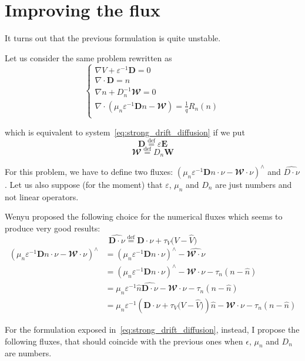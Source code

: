 \documentclass[a4paper,12pt, draft]{article}
\newcommand{\Def}{\stackrel{\mathrm{def}}{=}}
\newcommand{\diver}[1]{\ensuremath{\nabla \cdot #1}}
\newcommand{\WW}{\mathbfcal{W}}
\begin{document}
\section{Improving the flux}
It turns out that the previous formulation is quite unstable.

Let us consider the same problem rewritten as
\[
 \begin{cases}
  \nabla V + \varepsilon^{-1}\mathbf{D} = 0 \\
  \diver{\mathbf{D}} = n \\
  \nabla n + D_n^{-1} \WW = 0 \\
  \diver{\left(\mu_n \varepsilon^{-1} \mathbf{D} n - \WW \right)} = \frac{1}{q}R_n(n) \\
 \end{cases}
\]

which is equivalent to system~\ref{eq:strong_drift_diffusion} if we put
\[
  \mathbf{D} \Def \varepsilon \mathbf{E}
\]
\[
  \WW \Def D_n \mathbf{W}
\]

For this problem, we have to define two fluxes: $\left(\mu_n
\varepsilon^{-1} \mathbf{D} n \cdot \nu - \WW \cdot \nu \right)^{\wedge}$ and $\widehat{D \cdot
\nu}$.
Let us also suppose (for the moment) that $\varepsilon$, $\mu_n$ and $D_n$ are just numbers and not
linear operators.

Wenyu proposed the following choice for the numerical fluxes which seems to produce very good
results:
\[
  \widehat{\mathbf{D} \cdot \nu} \Def \mathbf{D} \cdot \nu + \tau_V \big( V - \widehat{V} \big)
\]
\[
\begin{aligned}
  \left(\mu_n \varepsilon^{-1} \mathbf{D} n \cdot \nu - \WW \cdot \nu \right)^{\wedge} \!
    & = \left(\mu_n \varepsilon^{-1} \mathbf{D} n \cdot \nu\right)^{\wedge} - \widehat{\WW \cdot
        \nu} \\
    & = \left(\mu_n \varepsilon^{-1} \mathbf{D} n \cdot \nu\right)^{\wedge} - \WW \cdot
        \nu - \tau_n \left(n - \widehat{n} \right) \\
    & = \mu_n \varepsilon^{-1} \widehat{n} \widehat{\mathbf{D} \cdot \nu} - \WW \cdot
        \nu - \tau_n \left(n - \widehat{n} \right) \\
    & = \mu_n \varepsilon^{-1} \! \left(\mathbf{D} \cdot \nu + \tau_V \big( V \! - \! \widehat{V}
        \big)\! \right)\!\widehat{n} - \WW \cdot \nu - \tau_n
        \left(n \! - \! \widehat{n} \right)
 \end{aligned}
\]

For the formulation exposed in~\ref{eq:strong_drift_diffusion}, instead, I propose the following
fluxes, that should coincide with the previous ones when $\epsilon$, $\mu_n$ and $D_n$ are numbers.
\end{document}
